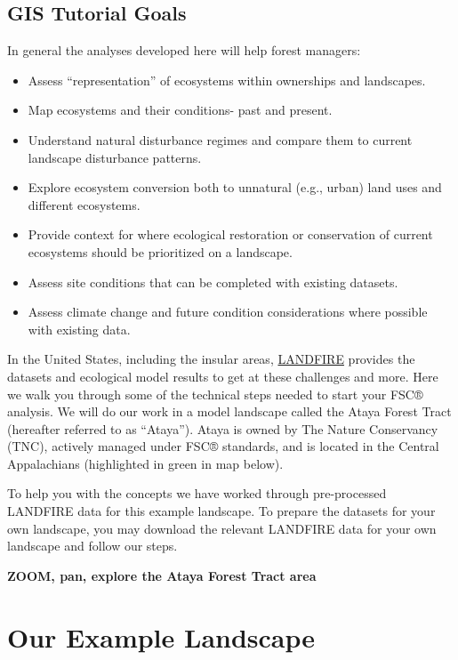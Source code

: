 \documentclass[
]{book}
\providecommand{\tightlist}{%
  \setlength{\itemsep}{0pt}\setlength{\parskip}{0pt}}
\begin{document}
\hypertarget{gis-tutorial-goals}{%
\section{GIS Tutorial Goals}\label{gis-tutorial-goals}}

In general the analyses developed here will help forest managers:

\begin{itemize}
\tightlist
\item
  Assess ``representation'' of ecosystems within ownerships and landscapes.
\item
  Map ecosystems and their conditions- past and present.
\item
  Understand natural disturbance regimes and compare them to current landscape disturbance patterns.
\item
  Explore ecosystem conversion both to unnatural (e.g., urban) land uses and different ecosystems.
\item
  Provide context for where ecological restoration or conservation of current ecosystems should be prioritized on a landscape.\\
\item
  Assess site conditions that can be completed with existing datasets.
\item
  Assess climate change and future condition considerations where possible with existing data.
\end{itemize}

In the United States, including the insular areas, \href{https://www.landfire.gov/}{LANDFIRE} provides the datasets and ecological model results to get at these challenges and more. Here we walk you through some of the technical steps needed to start your FSC® analysis. We will do our work in a model landscape called the Ataya Forest Tract (hereafter referred to as ``Ataya''). Ataya is owned by The Nature Conservancy (TNC), actively managed under FSC® standards, and is located in the Central Appalachians (highlighted in green in map below).

To help you with the concepts we have worked through pre-processed LANDFIRE data for this example landscape. To prepare the datasets for your own landscape, you may download the relevant LANDFIRE data for your own landscape and follow our steps.

\textbf{ZOOM, pan, explore the Ataya Forest Tract area}

\hypertarget{Ataya}{%
\chapter{Our Example Landscape}\label{Ataya}}
\end{document}
